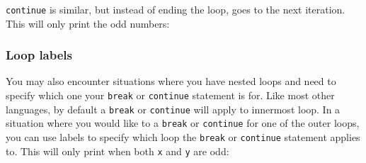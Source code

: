 \documentclass[a4paper,]{book}
\newenvironment{Shaded}{\begin{snugshade}}{\end{snugshade}}
\newcommand{\KeywordTok}[1]{\textcolor[rgb]{0.13,0.29,0.53}{\textbf{{#1}}}}
\newcommand{\DecValTok}[1]{\textcolor[rgb]{0.00,0.00,0.81}{{#1}}}
\newcommand{\StringTok}[1]{\textcolor[rgb]{0.31,0.60,0.02}{{#1}}}
\newcommand{\CommentTok}[1]{\textcolor[rgb]{0.56,0.35,0.01}{\textit{{#1}}}}
\newcommand{\OtherTok}[1]{\textcolor[rgb]{0.56,0.35,0.01}{{#1}}}
\newcommand{\PreprocessorTok}[1]{\textcolor[rgb]{0.56,0.35,0.01}{\textit{{#1}}}}
\newcommand{\NormalTok}[1]{{#1}}
\begin{document}
\texttt{continue} is similar, but instead of ending the loop, goes to
the next iteration. This will only print the odd numbers:

\begin{Shaded}
\end{Shaded}

\subsubsection{Loop labels}\label{loop-labels}

You may also encounter situations where you have nested loops and need
to specify which one your \texttt{break} or \texttt{continue} statement
is for. Like most other languages, by default a \texttt{break} or
\texttt{continue} will apply to innermost loop. In a situation where you
would like to a \texttt{break} or \texttt{continue} for one of the outer
loops, you can use labels to specify which loop the \texttt{break} or
\texttt{continue} statement applies to. This will only print when both
\texttt{x} and \texttt{y} are odd:

\begin{Shaded}
\end{Shaded}
\end{document}

